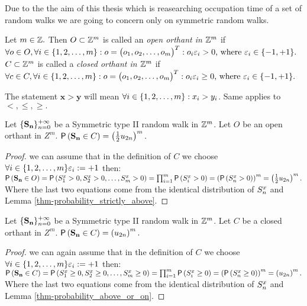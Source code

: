 \begin{rem}
  Due to the the aim of this thesis which is reasearching occupation time of a set of random walks we are going to concern only on symmetric random walks.
\end{rem}
\begin{defn}
  Let $m \in \mathbb{Z}.$ Then $O\subset \mathbb{Z}^m$ is called an \emph{open orthant in $\mathbb{Z}^m$} if $\forall o \in O, \forall i \in \{1,2,\ldots, m\}:o=\begin{pmatrix}
  o_1, o_2, \ldots, o_m
  \end{pmatrix}^T:o_i\varepsilon_i>0 \text{, where } \varepsilon_i\in \{-1,+1\}.$
  $C\subset \mathbb{Z}^m$ is called a \emph{closed orthant in $\mathbb{Z}^m$} if $\forall c \in C, \forall i \in \{1,2,\ldots, m\}:o=\begin{pmatrix}
  o_1, o_2, \ldots, o_m
  \end{pmatrix}^T:o_i\varepsilon_i\geq0 \text{, where } \varepsilon_i\in \{-1,+1\}.$
\end{defn}
\begin{rem}
  The statement $\mathbf{x}>\mathbf{y}$ will mean $\forall i \in \{1,2,\ldots, m\}:x_i>y_i$. Same applies to $<,\leq, \geq.$
\end{rem}
\begin{thm}\label{thm-prob_being_open_orthant}
  Let $\{\mathbf{\mathbf{S_n}}\}_{n=0}^{+\infty}$ be a Symmetric type II random walk in $\mathbb{Z}^m$. Let $O$ be an open orthant in $Z^m$. $\operatorname{\textsf{P}} \left(\mathbf{S_n}\in C\right)=\left( \frac{1}{2} u_{2n}\right)^m.$
\end{thm}
\begin{proof}
  \Wlog we can assume that in the definition of $C$ we choose $\forall i \in \{1,2,\ldots, m\} \varepsilon_i := +1$ then:
  $\pr \left(\mathbf{S_n}\in O\right)
  =\pr \left(\s[1]>0, \s[2]>0, \ldots, \s[m]>0\right)
  =\prod_{i=1}^m \pr \left(\s[i]>0\right)
  =\left(\pr \left( \s>0\right)\right)^m
  =\left(\h u_{2n}\right)^m.$
  Where the last two equations come from the identical distribution of $\s$ and Lemma \ref{thm-probability_strictly_above}.
\end{proof}
\begin{thm}\label{thm-prob_being_closed_orthant}
  Let $\{\mathbf{\mathbf{S_n}}\}_{n=0}^{+\infty}$ be a Symmetric type II random walk in $\mathbb{Z}^m$. Let $C$ be a closed orthant in $Z^m$. $\operatorname{\textsf{P}} \left(\mathbf{S_n}\in C\right)=\left(u_{2n}\right)^m.$
\end{thm}
\begin{proof}
  \Wlog we can again assume that in the definition of $C$ we choose $\forall i \in \{1,2,\ldots, m\} \varepsilon_i := +1$ then:
  $\pr \left(\mathbf{S_n}\in C\right)
  =\pr \left(\s[1]\geq0, \s[2]\geq0, \ldots, \s[m]\geq0\right)
  =\prod_{i=1}^m \pr \left(\s[i]\geq 0\right)
  =\left(\pr \left( \s\geq0\right)\right)^m
  =\left(u_{2n}\right)^m.$
  Where the last two equations come from the identical distribution of $\s$ and Lemma \ref{thm-probability_above_or_on}.
\end{proof}
